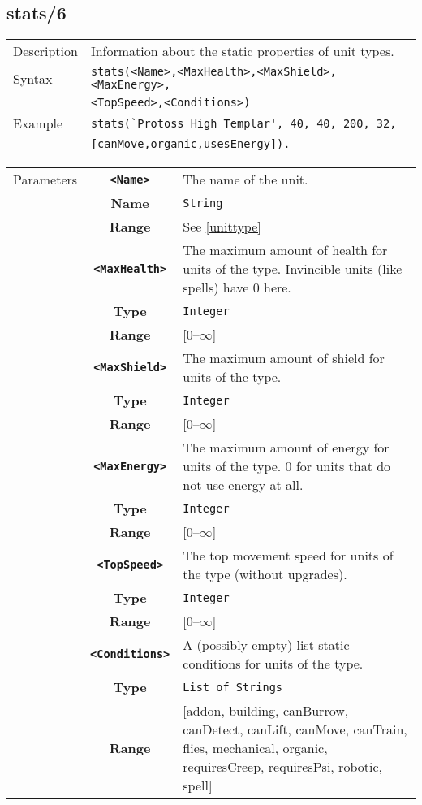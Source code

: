 \subsection{stats/6}
\begin{tabularx}{\textwidth}{lX}
 Description & Information about the static properties of unit types. \\
 Syntax & \verb|stats(<Name>,<MaxHealth>,<MaxShield>,<MaxEnergy>,| \\ & \quad \verb|<TopSpeed>,<Conditions>)| \\
 Example & \verb|stats(`Protoss High Templar', 40, 40, 200, 32,| \\ & \quad \verb|[canMove,organic,usesEnergy]).| \\
 \end{tabularx}
 \begin{tabularx}{\textwidth}{l | c | p{8cm}|}
 \cline{2-3}
 Parameters & \textbf{\verb|<Name>|} & The name of the unit. \\
            & \textbf{Name} & \verb|String| \\
            & \textbf{Range} & See \ref{unittype} \\
            \cline{2-3}
            & \textbf{\verb|<MaxHealth>|} & The maximum amount of health for units of the type. Invincible units (like spells) have 0 here. \\
            & \textbf{Type} & \verb|Integer| \\
            & \textbf{Range} & [0--$\infty$] \\
            \cline{2-3}
            & \textbf{\verb|<MaxShield>|} & The maximum amount of shield for units of the type. \\
            & \textbf{Type} & \verb|Integer| \\
            & \textbf{Range} & [0--$\infty$] \\
            \cline{2-3}
            & \textbf{\verb|<MaxEnergy>|} & The maximum amount of energy for units of the type. 0 for units that do not use energy at all. \\
            & \textbf{Type} & \verb|Integer| \\
            & \textbf{Range} & [0--$\infty$] \\
            \cline{2-3}
            & \textbf{\verb|<TopSpeed>|} & The top movement speed for units of the type (without upgrades).\\
            & \textbf{Type} & \verb|Integer| \\
            & \textbf{Range} & [0--$\infty$] \\
            \cline{2-3}
            & \textbf{\verb|<Conditions>|} & A (possibly empty) list static conditions for units of the type. \\
            & \textbf{Type} & \verb|List of Strings| \\
            & \textbf{Range} & [addon, building, canBurrow, canDetect, canLift, canMove, canTrain, flies, mechanical, organic, requiresCreep, requiresPsi, robotic, spell] \\
            \cline{2-3}
\end{tabularx}

